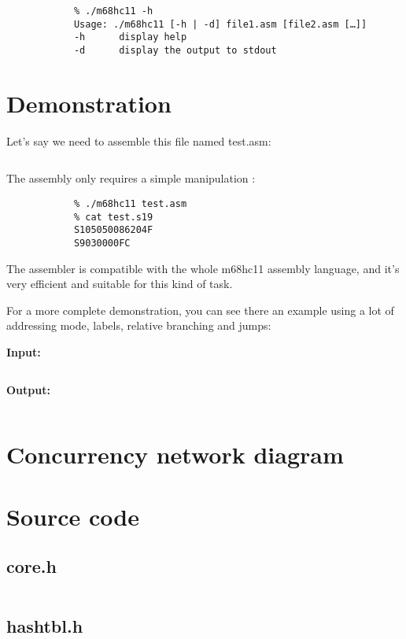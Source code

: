 \documentclass[a4paper,11pt]{article}
\begin{document}
        \begin{verbatim}
            % ./m68hc11 -h
            Usage: ./m68hc11 [-h | -d] file1.asm [file2.asm […]]
            -h      display help
            -d      display the output to stdout
        \end{verbatim}


    \section{Demonstration}
        
        Let's say we need to assemble this file named test.asm:

        \inputminted{nasm}{../../asm/test.asm}

        The assembly only requires a simple manipulation :

        \begin{verbatim}
            % ./m68hc11 test.asm
            % cat test.s19
            S105050086204F
            S9030000FC
        \end{verbatim}

        The assembler is compatible with the whole m68hc11 assembly language, 
        and it's very efficient and suitable for this kind of task.

        For a more complete demonstration, you can see there an example using a
        lot of addressing mode, labels, relative branching and jumps:

        \textbf{Input:}
        \inputminted{nasm}{../../asm/long.asm}

        \textbf{Output:}
        \inputminted{console}{../../asm/long.s19}

    \section{Concurrency network diagram}
        

    \newpage
    \section{Source code}
        \subsection{core.h}
            \inputminted[linenos]{c}{../../src/core.h}
        \subsection{hashtbl.h}
            \inputminted[linenos]{c}{../../src/hashtbl.h}
\end{document}
